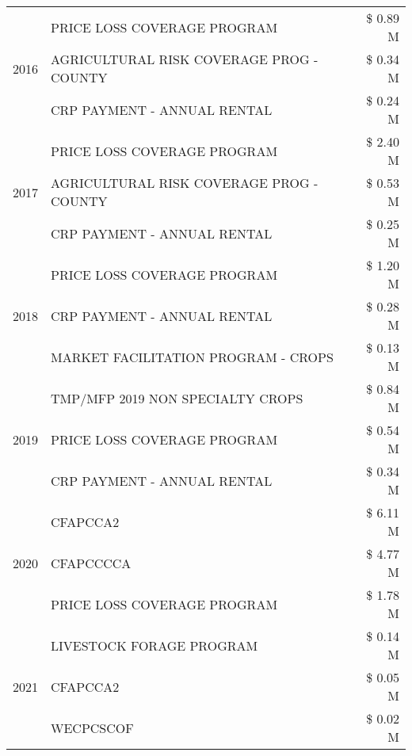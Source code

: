 \begin{tabular}{llr}
\cline{1-3}
\multirow[t]{3}{*}{2016} & PRICE LOSS COVERAGE PROGRAM & \$ 0.89 M \\
 & AGRICULTURAL RISK COVERAGE PROG - COUNTY & \$ 0.34 M \\
 & CRP PAYMENT - ANNUAL RENTAL & \$ 0.24 M \\
\cline{1-3}
\multirow[t]{3}{*}{2017} & PRICE LOSS COVERAGE PROGRAM & \$ 2.40 M \\
 & AGRICULTURAL RISK COVERAGE PROG - COUNTY & \$ 0.53 M \\
 & CRP PAYMENT - ANNUAL RENTAL & \$ 0.25 M \\
\cline{1-3}
\multirow[t]{3}{*}{2018} & PRICE LOSS COVERAGE PROGRAM & \$ 1.20 M \\
 & CRP PAYMENT - ANNUAL RENTAL & \$ 0.28 M \\
 & MARKET FACILITATION PROGRAM - CROPS & \$ 0.13 M \\
\cline{1-3}
\multirow[t]{3}{*}{2019} & TMP/MFP 2019 NON SPECIALTY CROPS & \$ 0.84 M \\
 & PRICE LOSS COVERAGE PROGRAM & \$ 0.54 M \\
 & CRP PAYMENT - ANNUAL RENTAL & \$ 0.34 M \\
\cline{1-3}
\multirow[t]{3}{*}{2020} & CFAPCCA2 & \$ 6.11 M \\
 & CFAPCCCCA & \$ 4.77 M \\
 & PRICE LOSS COVERAGE PROGRAM & \$ 1.78 M \\
\cline{1-3}
\multirow[t]{3}{*}{2021} & LIVESTOCK FORAGE PROGRAM & \$ 0.14 M \\
 & CFAPCCA2 & \$ 0.05 M \\
 & WECPCSCOF & \$ 0.02 M \\
\cline{1-3}
\bottomrule
\end{tabular}
